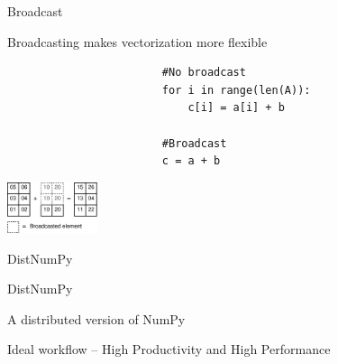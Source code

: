 \documentclass{beamer}
\begin{document}

\begin{frame}[fragile]{Broadcast}
\begin{center}
Broadcasting makes vectorization more flexible
\end{center}
\begin{scriptsize}
\begin{verbatim}
                        #No broadcast
                        for i in range(len(A)):
                            c[i] = a[i] + b
                  
                        #Broadcast
                        c = a + b
\end{verbatim}
\end{scriptsize}
\begin{center}
\includegraphics[width=100px]{../gfx/ufunc_broadcast}
\end{center}
\end{frame}


\begin{frame}{DistNumPy}
\begin{center}
\begin{Huge}
DistNumPy
\end{Huge}

\vspace{7px}
A distributed version of NumPy

\vspace{25px}
\begin{scriptsize}
Ideal workflow -- High Productivity and High Performance
\end{scriptsize}
\end{center}
\end{frame}

\end{document}
